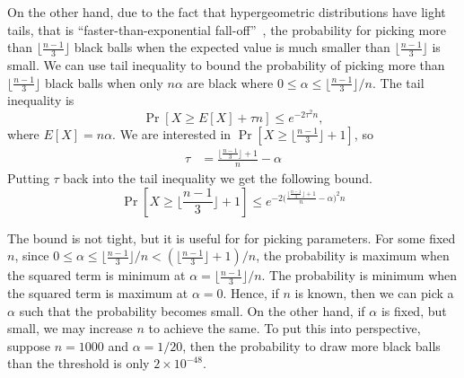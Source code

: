 On the other hand, due to the fact that hypergeometric distributions have light tails,
that is ``faster-than-exponential fall-off''~\cite{skala2013hypergeometric},
the probability for picking more than $\lfloor \frac{n-1}{3} \rfloor$ black balls when 
the expected value is  much smaller than $\lfloor \frac{n-1}{3} \rfloor$ is small.
We can use tail inequality to bound the probability of picking more than $\lfloor \frac{n-1}{3} \rfloor$ black balls when only $n\alpha$ are black where $0 \le \alpha \le \lfloor \frac{n-1}{3} \rfloor / n$.
The tail inequality is
$$
\Pr[X \ge E[X] + \tau n] \le e^{-2\tau^2n},
$$
where $E[X] = n\alpha$.
We are interested in $\Pr[X \ge \lfloor \frac{n-1}{3} \rfloor + 1]$, so
\begin{align*}
\tau &= \frac{\lfloor \frac{n-1}{3} \rfloor + 1}{n} - \alpha
\end{align*}
Putting $\tau$ back into the tail inequality we get the following bound.
$$
\Pr[X \ge \lfloor \frac{n-1}{3} \rfloor + 1] \le e^{-2 \big(\frac{\lfloor  \frac{n - 1}{3} \rfloor + 1}{n} - \alpha \big)^2 n}
$$

The bound is not tight, but it is useful for for picking parameters.
For some fixed $n$, since $0 \le \alpha \le \lfloor \frac{n-1}{3} \rfloor/n < (\lfloor  \frac{n - 1}{3} \rfloor + 1) / n$,
the probability is maximum when the squared term is minimum at $\alpha = \lfloor \frac{n-1}{3} \rfloor/n$.
The probability is minimum when the squared term is maximum at $\alpha = 0$.
Hence, if $n$ is known, then we can pick a $\alpha$ such that the probability becomes small.
On the other hand, if $\alpha$ is fixed, but small, we may increase $n$ to achieve the same.
To put this into perspective, suppose $n = 1000$ and $\alpha = 1/20$, then the probability to draw more black balls than the threshold is only $2 \times 10^{-48}$.

